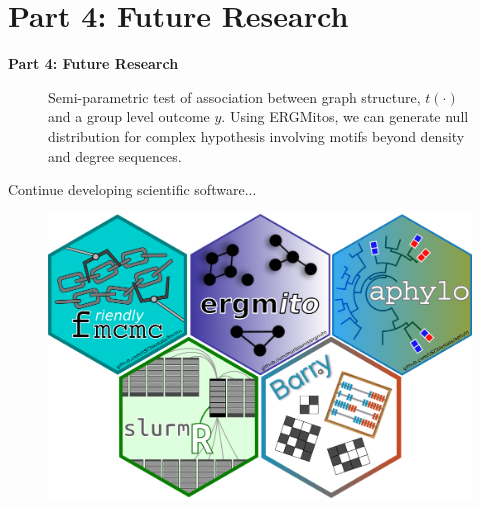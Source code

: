 \documentclass[aspectratio=169, 9pt, handout]{beamer}
\begin{document}
\section{Part 4: Future Research}

\begin{frame}[t]
	\textcolor{uscgold}{
		\Large {\bf Part 4: Future Research} 
	}
\end{frame}

\begin{frame}
		\def\svgwidth{.8\linewidth}
	\begin{figure}[tb]
		\centering
		
		\caption{Semi-parametric test of association between graph structure, $t(\cdot)$ and a group level outcome $y$. Using ERGMitos, we can generate null distribution for complex hypothesis involving motifs beyond density and degree sequences.}
		\label{fig:ergmito-sim}
	\end{figure}	
\end{frame}

\begin{frame}
	\Large Continue developing scientific software... \normalsize
	\begin{figure}
		\includegraphics[width=.65\linewidth]{fig-packages/hexlogos.png}
	\end{figure}
\end{frame}
\end{document}
